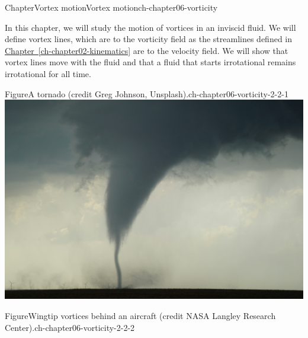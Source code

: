 \documentclass[oneside,10pt,]{book}
\newcommand{\xreffont}{\relax}
\numberwithin{equation}{section}
\begin{document}
\begin{chapterptx}{Chapter}{Vortex motion}{}{Vortex motion}{}{}{ch-chapter06-vorticity}
\renewcommand*{\chaptername}{Chapter}
\begin{introduction}{}%
In this chapter, we will study the motion of vortices in an inviscid fluid. We will define vortex lines, which are to the vorticity field as the streamlines defined in \hyperref[ch-chapter02-kinematics]{Chapter~{\xreffont\ref{ch-chapter02-kinematics}}} are to the velocity field. We will show that vortex lines move with the fluid and that a fluid that starts irrotational remains irrotational for all time.%
\begin{sidebyside}{3}{0}{0}{0}%
\begin{sbspanel}{0.333333333333333}%
\begin{panelfigureptx}{Figure}{A tornado (credit Greg Johnson, Unsplash).}{ch-chapter06-vorticity-2-2-1}{}%
\noindent\includegraphics[width=\linewidth]{external/ch-chapter06-greg-johnson-5V3FUicslvo-unsplash.jpg}
\tcblower
\end{panelfigureptx}%
\end{sbspanel}%
\begin{sbspanel}{0.333333333333333}%
\begin{panelfigureptx}{Figure}{Wingtip vortices behind an aircraft (credit NASA Langley Research Center).}{ch-chapter06-vorticity-2-2-2}{}%

\end{panelfigureptx}
\end{sbspanel}
\end{sidebyside}
\end{introduction}
\end{chapterptx}
\end{document}
